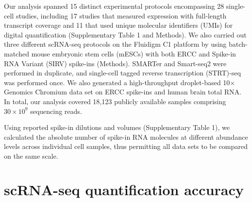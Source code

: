 Our analysis spanned 15 distinct experimental protocols encompassing 28 single-cell studies, including 17 studies that measured expression with full-length transcript coverage and 11 that used unique molecular identifiers (UMIs) for digital quantification (Supplementary Table 1 and Methods). We also carried out three different scRNA-seq protocols on the Fluidigm C1 platform by using batch-matched mouse embryonic stem cells (mESCs) with both ERCC and Spike-in RNA Variant (SIRV) spike-ins (Methods). SMARTer and Smart-seq2 were performed in duplicate, and single-cell tagged reverse transcription (STRT)-seq was performed once. We also generated a high-throughput droplet-based 10× Genomics Chromium data set on ERCC spike-ins and human brain total RNA. In total, our analysis covered 18,123 publicly available samples comprising \( 30 \times 10^9 \) sequencing reads.

Using reported spike-in dilutions and volumes (Supplementary Table 1), we calculated the absolute number of spike-in RNA molecules at different abundance levels across individual cell samples, thus permitting all data sets to be compared on the same scale.

\section{scRNA-seq quantification accuracy}

